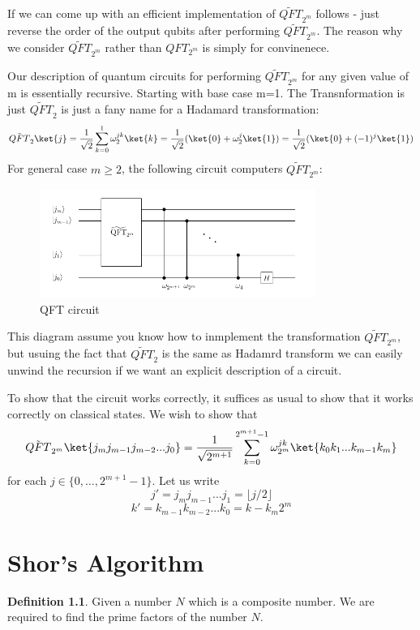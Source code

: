 \documentclass[12pt, oneside]{book}
\theoremstyle{definition}
\newtheorem{definition}{Definition}[section]
\theoremstyle{definition}
\theoremstyle{remark}
\begin{document}
If we can come up with an efficient implementation of $\tilde{QFT}_{2^m}$ follows - just reverse the order of the output qubits after performing $\tilde{QFT}_{2^m}$.
The reason why we consider $\tilde{QFT}_{2^m}$ rather than $QFT_{2^m}$ is simply for convinenece.

Our description of quantum circuits for performing $\tilde{QFT}_{2^m}$ for any given value of m is essentially recursive. Starting with base case m=1. The Transnformation is just
$\tilde{QFT}_2$ is just a fany name for a Hadamard transformation:
\[
\tilde{QFT}_2\ket{j}=\frac{1}{\sqrt{2}}\sum_{k=0}^1\omega_2^{jk}\ket{k}=\frac{1}{\sqrt{2}}(\ket{0}+\omega_2^j\ket{1})=\frac{1}{\sqrt{2}}(\ket{0}+(-1)^j\ket{1})
\]
For general case $m\geq 2$, the following circuit computers $\tilde{QFT}_{2^m}$:
\begin{figure}[H]
    \centering
    \includegraphics[width=0.8\textwidth]{../images/qft_3.png}
    \caption{QFT circuit}
    \label{fig:qft_3}
\end{figure}

This diagram assume you know how to inmplement the transformation $\tilde{QFT}_{2^m}$, but usuing the fact that $\tilde{QFT}_2$ is the same 
as Hadamrd transform we can easily unwind the recursion if we want an explicit description of a circuit.

To show that the circuit works correctly, it suffices as usual to show that it works correctly on classical states. We
wish to show that 
\[
\tilde{QFT}_{2^m}\ket{j_mj_{m-1}j_{m-2}...j_0}=\frac{1}{\sqrt{2^{m+1}}}\sum_{k=0}^{2^{m+1}-1}\omega_{2^m}^{jk}\ket{k_0k_1...k_{m-1}k_m}
\]
for each $j \in \{0,\ldots,2^{m+1}-1\}$. Let us write
\[
j'=j_mj_{m-1}...j_1=\lfloor j/2\rfloor 
\]
\[
k'=k_{m-1}k_{m-2}...k_0=k-k_m2^m
\]

\chapter{Shor's Algorithm}
\begin{definition}
    Given a number $N$ which is a composite number. We are required to find the prime factors of the number $N$.
\end{definition}
\end{document}
